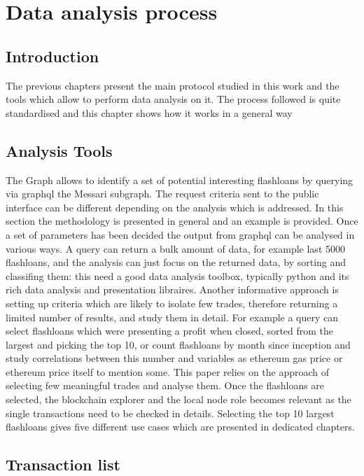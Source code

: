\documentclass[11pt,a4paper,titlepage]{scrartcl}
\begin{document}
\newpage

\section{Data analysis process}

\subsection{Introduction}
The previous  chapters present the main protocol studied in this work and the tools which allow to perform data analysis on it. 
The process followed is quite standardised and this chapter shows how it works in a general way 

\subsection{Analysis Tools}
The Graph allows to identify a set of potential interesting flashloans by querying via graphql the Messari subgraph. The request criteria sent to the public interface can be different depending on the analysis which is addressed. In this section the methodology is presented in general and an example is provided. Once a set of parameters has been decided the output from graphql can be analysed in various ways. A query can return a bulk amount of data, for example last 5000 flashloans, and the analysis can just focus on the returned data, by sorting and classifing them: this need a good data analysis toolbox, typically python and its rich data analysis and presentation libraires. Another informative approach is setting up criteria which are likely to isolate few trades, therefore returning a limited number of results, and study them in detail. For example a query can select flashloans which were presenting a profit when closed, sorted from the largest and picking the top 10, or count flashloans by month since inception and study  correlations between this number and variables as ethereum gas price or ethereum price itself to mention some.  This paper relies on the  approach of selecting few meaningful trades and analyse them. 
Once the flashloans are selected, the blockchain explorer and the local node role becomes relevant as the single transactions need  to be checked in details.
Selecting the top 10 largest flashloans gives five different use cases which are presented in dedicated chapters. 

\subsection{Transaction list}
\end{document}
